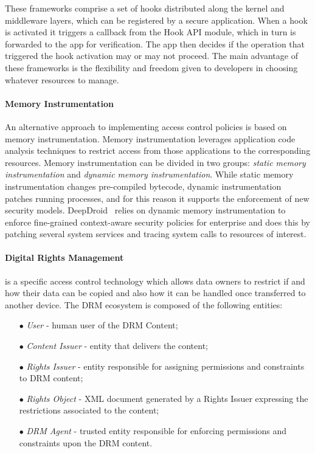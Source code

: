 These frameworks comprise a set of hooks distributed along the kernel and middleware layers, which can be registered by a secure application. When a hook is activated it triggers a callback from the Hook API module, which in turn is forwarded to the app for verification. The app then decides if the operation that triggered the hook activation may or may not proceed. The main advantage of these frameworks is the flexibility and freedom given to developers in choosing whatever resources to manage.

\paragraph{\textbf{Memory Instrumentation}}

An alternative approach to implementing access control policies is based on memory instrumentation. Memory instrumentation leverages application code analysis techniques to restrict access from those applications to the corresponding resources. Memory instrumentation can be divided in two groups: \emph{static memory instrumentation} and \emph{dynamic memory instrumentation}. While static memory instrumentation changes pre-compiled bytecode, dynamic instrumentation patches running processes, and for this reason it supports the enforcement of new security models. DeepDroid~\cite{wang2015deepdroid} relies on dynamic memory instrumentation to enforce fine-grained context-aware security policies for enterprise and does this by patching several system services and tracing system calls to resources of interest.

\paragraph{\textbf{Digital Rights Management}} is a specific access control technology which allows data owners to restrict if and how their data can be copied and also how it can be handled once transferred to another device.
The \ac{DRM} ecosystem is composed of the following entities:

\begin{itemize}
	\item[$\bullet$] \emph{User} - human user of the DRM Content;
	\item[$\bullet$] \emph{Content Issuer} - entity that delivers the content;
	\item[$\bullet$] \emph{Rights Issuer} - entity responsible for assigning permissions and constraints to \ac{DRM} content;
	\item[$\bullet$] \emph{Rights Object} - XML document generated by a Rights Issuer expressing the restrictions associated to the content;
	\item[$\bullet$] \emph{\ac{DRM} Agent} - trusted entity responsible for enforcing permissions and constraints upon the \ac{DRM} content.
\end{itemize}


